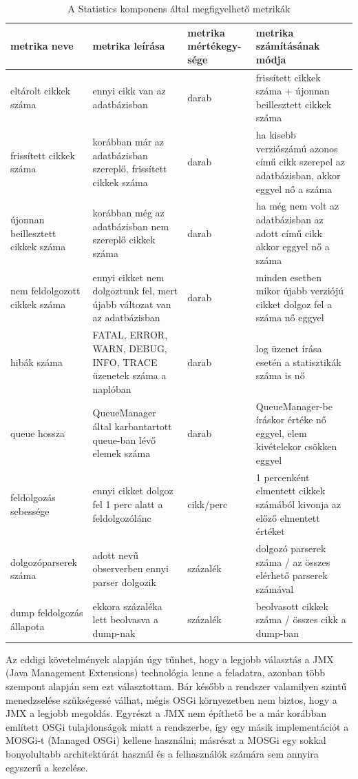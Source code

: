 \begin{table}[hbt]
\begin{center}
\begin{tabular}{|L{2.6cm}|L{4.5cm}|L{2cm}|L{4.7cm}|}
\hline
\textbf{metrika neve} & \textbf{metrika leírása} & \textbf{metrika mértékegy-sége} & \textbf{metrika számításának módja} \\ \hline \hline
eltárolt cikkek száma & ennyi cikk van az adatbázisban & darab & frissített cikkek száma + újonnan beillesztett cikkek száma \\ \hline
frissített cikkek száma & korábban már az adatbázisban szereplő, frissített cikkek száma & darab & ha kisebb verziószámú azonos című cikk szerepel az adatbázisban, akkor eggyel nő a száma \\ \hline
újonnan beillesztett cikkek száma & korábban még az adatbázisban nem szereplő cikkek száma & darab & ha még nem volt az adatbázisban az adott című cikk akkor eggyel nő a száma \\ \hline
nem feldolgozott cikkek száma & ennyi cikket nem dolgoztunk fel, mert újabb változat van az adatbázisban & darab & minden esetben mikor újabb verziójú cikket dolgoz fel a száma nő eggyel \\ \hline
hibák száma & FATAL, ERROR, WARN, DEBUG, INFO, TRACE üzenetek száma a naplóban & darab & log üzenet írása esetén a statisztikák száma is nő \\ \hline
queue hossza & QueueManager által karbantartott queue-ban lévő elemek száma & darab & QueueManager-be íráskor értéke nő eggyel, elem kivételekor csökken eggyel \\ \hline
feldolgozás sebessége & ennyi cikket dolgoz fel 1 perc alatt a feldolgozólánc & cikk/perc & 1 percenként elmentett cikkek számából kivonja az előző elmentett értéket \\ \hline
dolgozóparserek száma & adott nevű observerben ennyi parser dolgozik & százalék & dolgozó parserek száma / az összes elérhető parserek számával \\ \hline
dump feldolgozás állapota & ekkora százaléka lett beolvasva a dump-nak & százalék & beolvasott cikkek száma / összes cikk a dump-ban \\
\hline
\end{tabular}
\end{center}
\caption{\label{tab:metrics} A Statistics komponens által megfigyelhető metrikák}
\end{table}

Az eddigi követelmények alapján úgy tűnhet, hogy a legjobb választás a JMX (Java Management Extensions) technológia lenne a feladatra, azonban több szempont alapján sem ezt választottam. Bár később a rendszer valamilyen szintű menedzselése szükségessé válhat, mégis OSGi környezetben nem biztos, hogy a JMX a legjobb megoldás. Egyrészt a JMX nem építhető be a már korábban említett OSGi tulajdonságok miatt a rendszerbe, így egy másik implementációt a MOSGi-t (Managed OSGi) kellene használni; másrészt a MOSGi egy sokkal bonyolultabb architektúrát használ és a felhasználók számára sem annyira egyszerű a kezelése.

